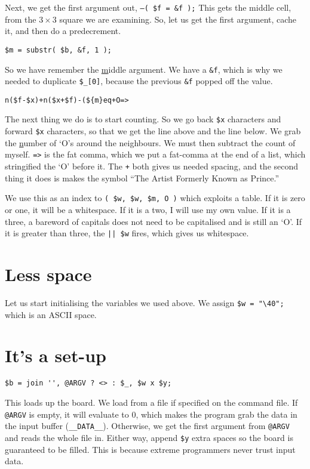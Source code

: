 \documentclass{article}
\begin{document}
Next, we get the first argument out, \mbox{\texttt{--( \$f = \&f );}}  
This gets the middle cell, from the $3 \times 3$ square we are examining.  
So, let us get the first argument, cache it, and then do a predecrement.

\begin{verbatim}
$m = substr( $b, &f, 1 );
\end{verbatim}
So we have remember the \underline{m}iddle argument.  We have a
\texttt{\&f},
which is why we needed to duplicate \texttt{\$\_[0]}, because the
previous \texttt{\&f} popped off the value.

\begin{verbatim}
n($f-$x)+n($x+$f)-(${m}eq+O=>
\end{verbatim}
The next thing we do is to start counting.  So we go back \texttt{\$x}
characters and forward \texttt{\$x} characters, so that we get the line
above and the line below.  We grab the \underline{n}umber of `O's around 
the neighbours.  We
must then subtract the count of myself.  \texttt{=>} is the fat comma, which we
put a fat-comma at the end of a list, which stringified the `O' before it.
The \texttt{+} both gives us needed spacing, and the second thing it
does is makes the symbol ``The Artist Formerly Known as Prince.''

We use this as an index to \mbox{\texttt{( \$w, \$w, \$m, O )}} which 
exploits a table.  If
it is zero or one, it will be a whitespace.  If it is a two, I will use
my own value.  If it is a three, a bareword of capitals does not need to
be capitalised and is still an `O'.  If it is greater than three, the
\verb-|| $w- fires, which gives us whitespace.

\section{Less space}
Let us start initialising the variables we used above.  We assign
\verb'$w = "\40";' which is an ASCII space.

\section{It's a set-up}
\begin{verbatim}
$b = join '', @ARGV ? <> : $_, $w x $y;
\end{verbatim}

This loads up the board.  We load from a file if specified on the
command file.  If \verb"@ARGV" is empty, it will evaluate to 0, which
makes the program grab the data in the input buffer (\verb"__DATA__").
Otherwise, we get the first argument from \verb"@ARGV" and reads the
whole file in.  Either way, append \verb"$y" extra spaces so the board
is guaranteed to be filled.  This is because extreme programmers never
trust input data.
\end{document}
